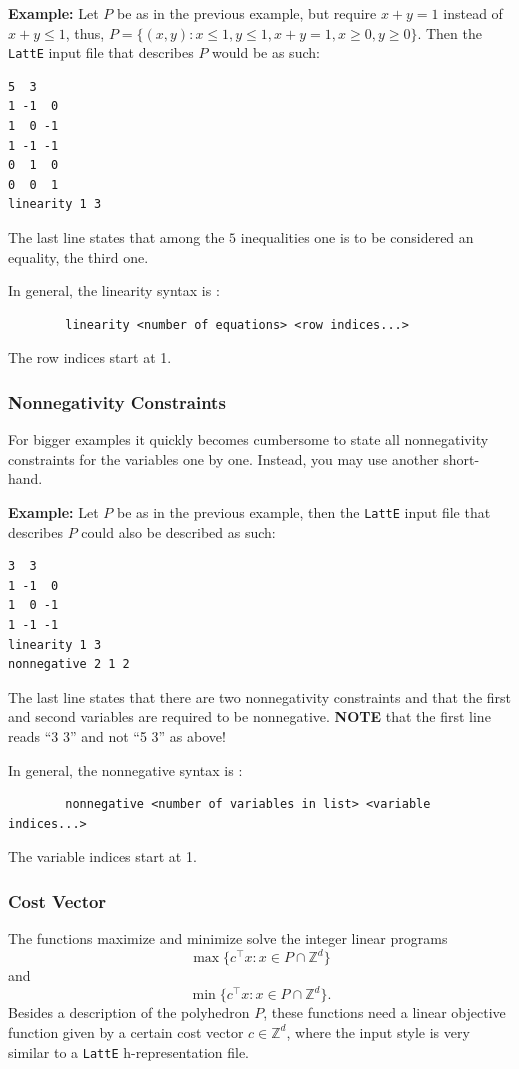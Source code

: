 \documentclass{article}
\newcommand{\Z}{{\mathbb Z}}
\newcommand{\latte}{{\tt LattE}\xspace}
\newcommand{\example}{{\bf Example:\space}}
\begin{document}
\example
Let $P$ be as in the previous example, but require $x+y=1$ instead of
$x+y\leq 1$, thus, 
$P=\{(x,y): x\leq 1, y\leq 1, x+y=1, x\geq 0, y\geq 0\}$.
Then the {\tt LattE} input file that describes $P$ would be as such:
\begin{verbatim}
5  3
1 -1  0
1  0 -1
1 -1 -1
0  1  0
0  0  1
linearity 1 3
\end{verbatim}
The last line states that among the $5$ inequalities one is to be
considered an equality, the third one.

In general, the linearity syntax is :
\begin{verbatim}
        linearity <number of equations> <row indices...>
\end{verbatim}
The row indices start at 1.

\subsubsection{Nonnegativity Constraints}
For bigger examples it quickly becomes cumbersome to state all
nonnegativity constraints for the variables one by one. Instead, you
may use another short-hand.

\example
Let $P$ be as in the previous example, then the {\tt LattE} input file
that describes $P$ could also be described as such: 
\begin{verbatim}
3  3
1 -1  0
1  0 -1
1 -1 -1
linearity 1 3
nonnegative 2 1 2
\end{verbatim}
The last line states that there are two nonnegativity constraints and
that the first and second variables are required to be nonnegative. 
{\bf NOTE} that the first line reads ``3 3'' and not ``5 3'' as above! 

In general, the nonnegative syntax is :
\begin{verbatim}
        nonnegative <number of variables in list> <variable indices...>
\end{verbatim}
The variable indices start at 1.


\subsubsection{Cost Vector}
The functions maximize and minimize solve the integer linear programs
\[
\max\{c^\intercal x: x\in P\cap\Z^d\}
\]
and
\[
\min\{c^\intercal x: x\in P\cap\Z^d\}.
\]
Besides a description of the polyhedron $P$, these functions need a
linear objective function given by a certain cost vector $c \in \Z^d$, where the input style is very similar to a \latte h-representation file. 
\end{document}
